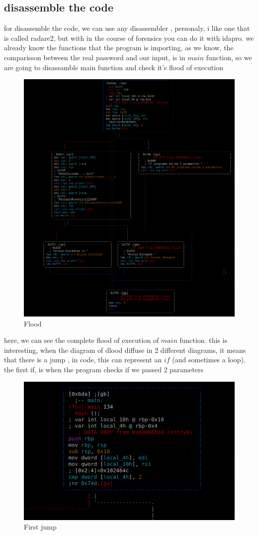 \documentclass[10pt,a4paper]{article} %
\begin{document}
        \newpage
        \subsection{disassemble the code}
            \newpage
            for disassemble the code, we can use any disassembler , personaly,
            i like one that is called radare2, but with in the course of
            forensics you can do it with idapro. we already know the functions
            that the program is importing, as we know, the comparisson between
            the real password and our input, is in $ main  $ function, so we
            are going to disassamble main function and check it's flood of
            execution
            \begin{figure}[h!]
                \centering
                \includegraphics[width=0.8\linewidth]{flood.png}
                \caption{Flood}
                \label{flood}
            \end{figure}
            \newpage
            here, we can see the complete flood of execution of $ main  $
            function. this is interesting, when the diagram of dlood diffuse in
            2 different diagrams, it means that there is a jump , in code, this
            can represent an $ if  $ (and sometimes a loop). the first if, is
            when the program checks if we passed 2 parameters
            \\
            \begin{figure}[h!]
                \centering
                \includegraphics[width=0.5\linewidth]{primerif.png}
                \caption{First jump}
                \label{fig:primerif}
            \end{figure}
\end{document}
